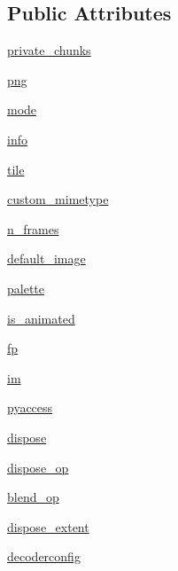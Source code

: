 \subsection*{Public Attributes}
\begin{DoxyCompactItemize}
\item 
\hyperlink{classPIL_1_1PngImagePlugin_1_1PngImageFile_ae4bda3d93121c869136336073bb1c0ea}{private\+\_\+chunks}
\item 
\hyperlink{classPIL_1_1PngImagePlugin_1_1PngImageFile_a58852f5457bce8a5c703eb4e244dc54e}{png}
\item 
\hyperlink{classPIL_1_1PngImagePlugin_1_1PngImageFile_aa5b5366ad239f1829ffe6a34882701e4}{mode}
\item 
\hyperlink{classPIL_1_1PngImagePlugin_1_1PngImageFile_aa4fb73c03866fa310a7d75d761822913}{info}
\item 
\hyperlink{classPIL_1_1PngImagePlugin_1_1PngImageFile_a92dbd4116c7f0d59adcdcbd3baea0a5d}{tile}
\item 
\hyperlink{classPIL_1_1PngImagePlugin_1_1PngImageFile_aa12107ec39ca22626de595034dd6aa39}{custom\+\_\+mimetype}
\item 
\hyperlink{classPIL_1_1PngImagePlugin_1_1PngImageFile_abe948a705f97cc70c3b2ddb5976fa886}{n\+\_\+frames}
\item 
\hyperlink{classPIL_1_1PngImagePlugin_1_1PngImageFile_af5548acf1345feeaf9d9f4301b757502}{default\+\_\+image}
\item 
\hyperlink{classPIL_1_1PngImagePlugin_1_1PngImageFile_a44d24ebbfe2873676344aa6df15ed64d}{palette}
\item 
\hyperlink{classPIL_1_1PngImagePlugin_1_1PngImageFile_adc397795f1a3539cbeb57c79fcc332af}{is\+\_\+animated}
\item 
\hyperlink{classPIL_1_1PngImagePlugin_1_1PngImageFile_ab3bdb014d01e9998a957f8a7168ece2b}{fp}
\item 
\hyperlink{classPIL_1_1PngImagePlugin_1_1PngImageFile_aeaa17bd3ac8bb15b7d49f749571544f7}{im}
\item 
\hyperlink{classPIL_1_1PngImagePlugin_1_1PngImageFile_a6426390d3f0fb02364e751aa93c84a3b}{pyaccess}
\item 
\hyperlink{classPIL_1_1PngImagePlugin_1_1PngImageFile_af1452a0e6fb14fed46ab8c7087fd78a5}{dispose}
\item 
\hyperlink{classPIL_1_1PngImagePlugin_1_1PngImageFile_abd799d045cdff2664e6bb5914b06335f}{dispose\+\_\+op}
\item 
\hyperlink{classPIL_1_1PngImagePlugin_1_1PngImageFile_a90e7c2bf0dc90d6a2c1fc904a660ecf1}{blend\+\_\+op}
\item 
\hyperlink{classPIL_1_1PngImagePlugin_1_1PngImageFile_a4cca0fb17451d43c04ce0f52039a98d2}{dispose\+\_\+extent}
\item 
\hyperlink{classPIL_1_1PngImagePlugin_1_1PngImageFile_a5f0be0b873d804035ec496a1b25e4198}{decoderconfig}
\end{DoxyCompactItemize}
